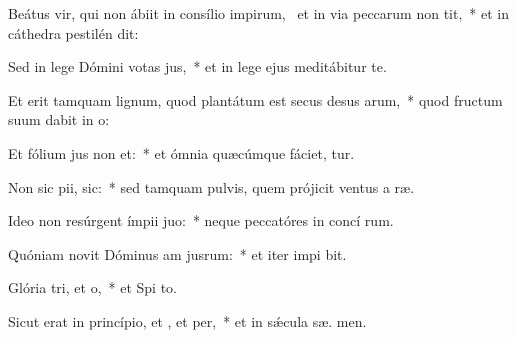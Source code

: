\item Beátus vir, qui non ábiit in consílio impirum,~\pscross{} et in via peccarum non tit,~* et in cáthedra pestilén  dit:
\item Sed in lege Dómini votas jus,~* et in lege ejus meditábitur   te.
\item Et erit tamquam lignum, quod plantátum est secus desus arum,~* quod fructum suum dabit in  o:
\item Et fólium jus non et:~* et ómnia quæcúmque fáciet, tur.
\item Non sic pii,  sic:~* sed tamquam pulvis, quem prójicit ventus a  ræ.
\item Ideo non resúrgent ímpii  juo:~* neque peccatóres in concí rum.
\item Quóniam novit Dóminus am jusrum:~* et iter impi bit.
\item Glória tri, et o,~* et Spi to.
\item Sicut erat in princípio, et , et per,~* et in sǽcula sæ. men.
